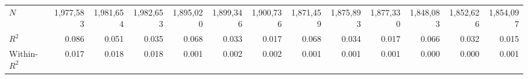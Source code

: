\begin{tabular}{lrrrrrrrrrrrr}
\midrule
$N$                                         &    1,977,583 &    1,981,654 &    1,982,653 &    1,895,020 &    1,899,346 &    1,900,736 &    1,871,459 &    1,875,893 &    1,877,330 &    1,848,083 &    1,852,626 &    1,854,097 \\ 
$R^2$                                       &        0.086 &        0.051 &        0.035 &        0.068 &        0.033 &        0.017 &        0.068 &        0.034 &        0.017 &        0.066 &        0.032 &        0.015 \\ 
Within-$R^2$                                &        0.017 &        0.018 &        0.018 &        0.001 &        0.002 &        0.002 &        0.001 &        0.001 &        0.001 &        0.000 &        0.000 &        0.001 \\ 
\bottomrule
\end{tabular}
